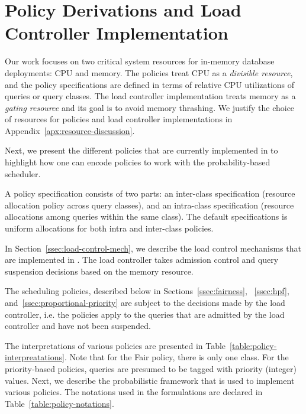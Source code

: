 \section{Policy Derivations and Load Controller Implementation}\label{sec:policy}
Our work focuses on two critical system resources for in-memory database deployments: CPU and memory. 
The policies treat CPU as a \textit{divisible resource}, and the policy specifications are defined in terms of relative CPU utilizations of queries or query classes.
The load controller implementation treats memory as a \textit{gating resource} and its goal is to avoid memory thrashing.
We justify the choice of resources for policies and load controller implementations in Appendix~\ref{apx:resource-discussion}.

Next, we present the different policies that are currently implemented in \sys{} to highlight how one can encode policies to work with the probability-based scheduler. 

A policy specification consists of two parts: an inter-class specification (resource allocation policy across query classes), and an intra-class specification (resource allocations among queries within the same class). 
The default specifications is uniform allocations for both intra and inter-class policies. 

In Section~\ref{ssec:load-control-mech}, we describe the load control mechanisms that are implemented in \sys{}. 
The load controller takes admission control and query suspension decisions based on the memory resource.

The scheduling policies, described below in Sections~\ref{ssec:fairness}, ~\ref{ssec:hpf}, and~\ref{ssec:proportional-priority} are subject to the decisions made by the load controller, i.e. the policies apply to the queries that are admitted by the load controller and have not been suspended. %


The interpretations of various policies are presented in Table~\ref{table:policy-interpreatations}.
Note that for the Fair policy, there is only one class. 
For the priority-based policies, queries are presumed to be tagged with priority (integer) values. 
Next, we describe the probabilistic framework that is used to implement various policies. 
The notations used in the formulations are declared in Table~\ref{table:policy-notations}.


